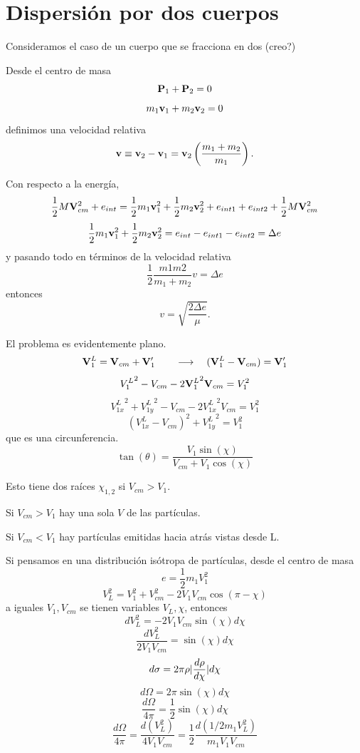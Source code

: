\documentclass[10pt,oneside]{CBFT_book}
\begin{document}
\section{Dispersión por dos cuerpos}

Consideramos el caso de un cuerpo que se fracciona en dos (creo?)

Desde el centro de masa
\[
	\vb{P}_1 + \vb{P}_2 = 0
\]
\[
	m_1 \vb{v}_1 + m_2 \vb{v}_2 = 0
\]
definimos una velocidad relativa
\[
	\vb{v} \equiv \vb{v}_2  - \vb{v}_1 = \vb{v}_2 \left( \frac{ m_1 + m_2 }{ m_1 }\right) .
\]

Con respecto a la energía,
\[
	\frac{1}{2} M \vb{V}_{cm}^2 + e_{int} = \frac{1}{2} m_1 \vb{v}_1^2 + \frac{1}{2} m_2 \vb{v}_2^2
						+ e_{int 1 } + e_{int 2} + \frac{1}{2} M \vb{V}_{cm}^2
\]
\[
	\frac{1}{2} m_1 \vb{v}_1^2 + \frac{1}{2} m_2 \vb{v}_2^2 = e_{int} - e_{int 1 } - e_{int 2} = \Delta e
\]
y pasando todo en términos de la velocidad relativa
\[
	 \frac{1}{2} \frac{m1 m2}{ m_1 + m_2 } v = \Delta e
\]
entonces 
\[
	v = \sqrt{\frac{ 2 \Delta e}{ \mu } }.
\]

El problema es evidentemente plano.
\[
	\vb{V}_1^L =  \vb{V}_{cm} + \vb{V}_1' \qquad \longrightarrow \quad ( \vb{V}_1^L - \vb{V}_{cm} ) = \vb{V}_1'
\]
\[
	{V_1^L}^2 - V_{cm} - 2 {\vb{V}_1^L}^2 \vb{V}_{cm} = V_1^2
\]
\[
	{V_{1x}^L}^2 + {V_{1y}^L}^2 - V_{cm} - 2 {V_{1x}^L}^2 V_{cm} = V_1^2
\]
\[
	( V_{1x}^L  - V_{cm} )^2 + {V_{1y}^L}^2 = V_1^2
\]
que es una circunferencia.
\[
	\tan(\theta) = \frac{V_1 \sin(\chi) }{ V_{cm} + V_1 \cos(\chi) }
\]

Esto tiene dos raíces $\chi_{1,2}$ si $ V_{cm} > V_1$. 

Si $ V_{cm} > V_1$ hay una sola $V$ de las partículas.

Si $ V_{cm} < V_1$ hay partículas emitidas hacia atrás vistas desde L.

Si pensamos en una distribución isótropa de partículas, desde el centro de masa
\[
	e = \frac{1}{2} m_1 V_{1}^2
\]
\[
	V_L^2 = V_1^2 + V_{cm}^2 - 2 V_1 V_{cm} \cos( \pi -\chi )
\]
a iguales $V_1,V_{cm}$ se tienen variables $V_L, \chi$, entonces
\[
	dV_L^2 = - 2 V_1 V_{cm} \sin(\chi) d\chi
\]
\[
	\frac{dV_L^2}{2 V_1 V_{cm}} = \sin( \chi) d\chi 
\]
\[
	d\sigma = 2 \pi \rho |\frac{d^{\hspace{-0.05em}} {\rho}}{d {\chi}^{\hspace{-0.05em}}}| d\chi 
\]
\[
	d\Omega = 2 \pi \sin( \chi ) d\chi 
\]
\[
	\frac{d\Omega}{4\pi} = \frac{1}{2} \sin( \chi ) d\chi 
\]
\[
	\frac{d\Omega}{4\pi} =  \frac{d (V_L^2) }{4 V_1 V_{cm}} = \frac{1}{2} \frac{d ( 1/2 m_1 V_L^2) }{m_1 V_1 V_{cm}} 
\]
\end{document}
